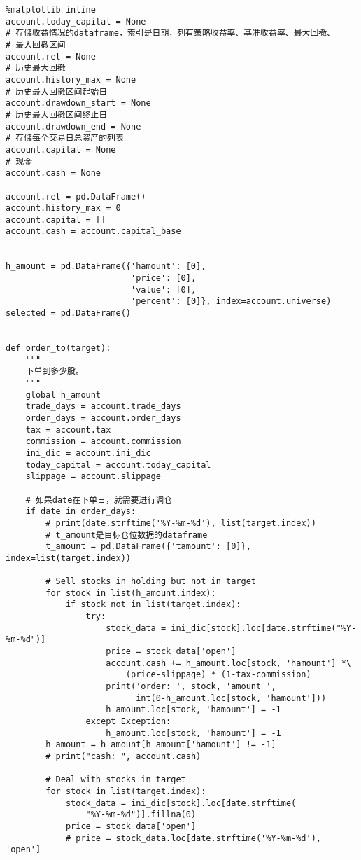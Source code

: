 \documentclass[11pt]{article}
\begin{document}
\lstset{language=Python,label= ,caption= ,captionpos=b,numbers=none}
\begin{lstlisting}
%matplotlib inline
account.today_capital = None
# 存储收益情况的dataframe，索引是日期，列有策略收益率、基准收益率、最大回撤、
# 最大回撤区间
account.ret = None
# 历史最大回撤
account.history_max = None
# 历史最大回撤区间起始日
account.drawdown_start = None
# 历史最大回撤区间终止日
account.drawdown_end = None
# 存储每个交易日总资产的列表
account.capital = None
# 现金
account.cash = None

account.ret = pd.DataFrame()
account.history_max = 0
account.capital = []
account.cash = account.capital_base


h_amount = pd.DataFrame({'hamount': [0],
                         'price': [0],
                         'value': [0],
                         'percent': [0]}, index=account.universe)
selected = pd.DataFrame()


def order_to(target):
    """
    下单到多少股。
    """
    global h_amount
    trade_days = account.trade_days
    order_days = account.order_days
    tax = account.tax
    commission = account.commission
    ini_dic = account.ini_dic
    today_capital = account.today_capital
    slippage = account.slippage

    # 如果date在下单日，就需要进行调仓
    if date in order_days:
        # print(date.strftime('%Y-%m-%d'), list(target.index))
        # t_amount是目标仓位数据的dataframe
        t_amount = pd.DataFrame({'tamount': [0]}, index=list(target.index))

        # Sell stocks in holding but not in target
        for stock in list(h_amount.index):
            if stock not in list(target.index):
                try:
                    stock_data = ini_dic[stock].loc[date.strftime("%Y-%m-%d")]
                    price = stock_data['open']
                    account.cash += h_amount.loc[stock, 'hamount'] *\
                        (price-slippage) * (1-tax-commission)
                    print('order: ', stock, 'amount ',
                          int(0-h_amount.loc[stock, 'hamount']))
                    h_amount.loc[stock, 'hamount'] = -1
                except Exception:
                    h_amount.loc[stock, 'hamount'] = -1
        h_amount = h_amount[h_amount['hamount'] != -1]
        # print("cash: ", account.cash)

        # Deal with stocks in target
        for stock in list(target.index):
            stock_data = ini_dic[stock].loc[date.strftime(
                "%Y-%m-%d")].fillna(0)
            price = stock_data['open']
            # price = stock_data.loc[date.strftime('%Y-%m-%d'), 'open']


\end{lstlisting}
\end{document}
